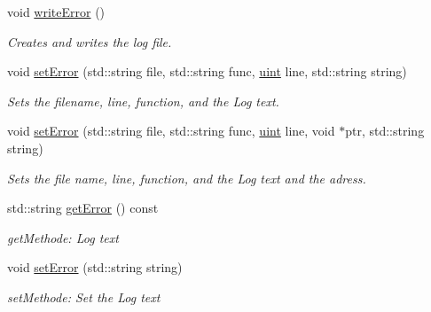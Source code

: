 \begin{DoxyCompactItemize}
\item 
\hypertarget{class_f2_c_1_1_log_error_a119ab8a21960a4b7a6dbd4ddce334e5f}{
void \hyperlink{class_f2_c_1_1_log_error_a119ab8a21960a4b7a6dbd4ddce334e5f}{writeError} ()}
\label{class_f2_c_1_1_log_error_a119ab8a21960a4b7a6dbd4ddce334e5f}

\begin{DoxyCompactList}\small\item\em Creates and writes the log file. \item\end{DoxyCompactList}\item 
void \hyperlink{class_f2_c_1_1_log_error_abce3f1efd9a5b93e1bd400f743ba398e}{setError} (std::string file, std::string func, \hyperlink{namespace_f2_c_a58be2bac9eb3e3c99cb41b6008bf4fae}{uint} line, std::string string)
\begin{DoxyCompactList}\small\item\em Sets the filename, line, function, and the Log text. \item\end{DoxyCompactList}\item 
void \hyperlink{class_f2_c_1_1_log_error_a37013f16d6418b8881c8df0be43909c6}{setError} (std::string file, std::string func, \hyperlink{namespace_f2_c_a58be2bac9eb3e3c99cb41b6008bf4fae}{uint} line, void $\ast$ptr, std::string string)
\begin{DoxyCompactList}\small\item\em Sets the file name, line, function, and the Log text and the adress. \item\end{DoxyCompactList}\item 
\hypertarget{class_f2_c_1_1_log_error_a48e68471f785fe0a6482c825dcfa15d0}{
std::string \hyperlink{class_f2_c_1_1_log_error_a48e68471f785fe0a6482c825dcfa15d0}{getError} () const }
\label{class_f2_c_1_1_log_error_a48e68471f785fe0a6482c825dcfa15d0}

\begin{DoxyCompactList}\small\item\em getMethode: Log text \item\end{DoxyCompactList}\item 
void \hyperlink{class_f2_c_1_1_log_error_ac571b7a599761f5ed869832b023a3d92}{setError} (std::string string)
\begin{DoxyCompactList}\small\item\em setMethode: Set the Log text \item\end{DoxyCompactList}\end{DoxyCompactItemize}
